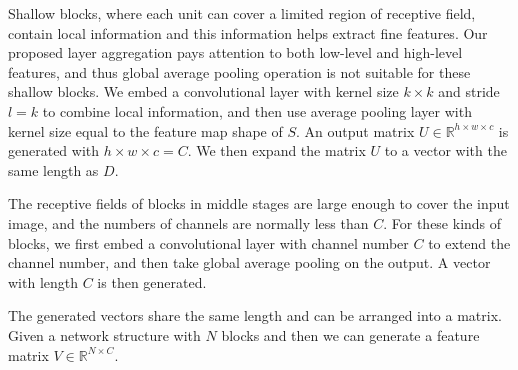 \documentclass[runningheads]{llncs}
\begin{document}
Shallow blocks, where each unit can cover a limited region of receptive field, contain local information and this information helps extract fine features. Our proposed layer aggregation pays attention to both low-level and high-level features,  and thus global average pooling operation is not suitable for these shallow blocks. We embed a convolutional layer with kernel size $k\times k$ and stride $l=k$ to combine local information, and then use average pooling layer with kernel size equal to the feature map shape of $S$.  An output matrix $U\in \mathbb{R}^{h\times w\times c}$ is generated with $h\times w\times c=C$.  We then expand the matrix $U$ to a vector with the same length as $D$.

The receptive fields of  blocks in middle stages are large enough to cover the input image, and the numbers of channels are normally less than $C$. For these kinds of blocks, we first embed a convolutional layer with channel number $C$ to extend the channel number, and then take global average pooling on the output. A vector with length $C$ is then generated.

The generated vectors share the same length and can be arranged into a matrix. Given a network structure with $N$ blocks and then we can generate a feature matrix $V\in \mathbb{R}^{N\times C}$.
\end{document}
